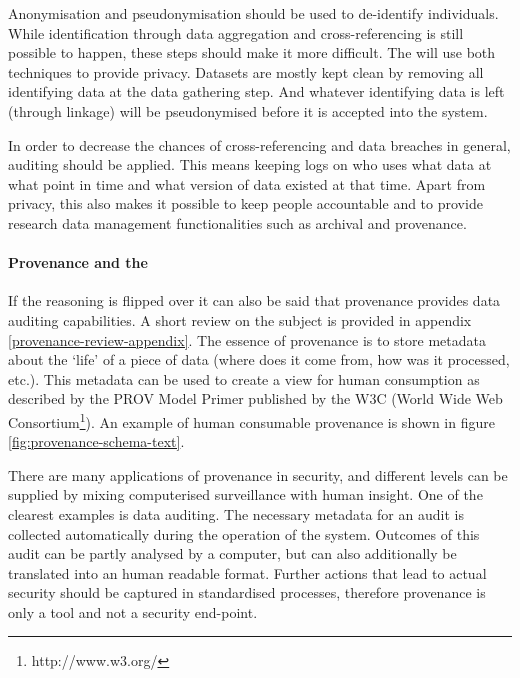Anonymisation and pseudonymisation should be used to de-identify individuals.
While identification through data aggregation and cross-referencing is still possible to happen, these steps should make it more difficult.
The \ivfsystem{} will use both techniques to provide privacy. Datasets are mostly kept clean by removing all identifying data at the data gathering step.
And whatever identifying data is left (through linkage) will be pseudonymised before it is accepted into the system.

In order to decrease the chances of cross-referencing and data breaches in general, auditing should be applied.
This means keeping logs on who uses what data at what point in time and what version of data existed at that time.
Apart from privacy, this also makes it possible to keep people accountable and to provide research data management functionalities such as archival and provenance.

\paragraph{Provenance and the \ivfsystem{}}
If the reasoning is flipped over it can also be said that provenance provides data auditing capabilities.
A short review on the subject is provided in appendix \ref{provenance-review-appendix}.
The essence of provenance is to store metadata about the `life' of a piece of data (where does it come from, how was it processed, etc.).
This metadata can be used to create a view for human consumption as described by the PROV Model Primer \cite{dsp8gil} published by the W3C (World Wide Web Consortium\footnote{http://www.w3.org/}).
An example of human consumable provenance is shown in figure \ref{fig:provenance-schema-text}.

There are many applications of provenance in security, and  different levels can be supplied by mixing computerised surveillance with human insight.
One of the clearest examples is  data auditing.
The necessary metadata for an audit is collected automatically during the operation of the system.
Outcomes of this audit can be partly analysed by a computer, but can also additionally be translated into an human readable format.
Further actions that lead to actual security  should be captured in standardised processes, therefore provenance is only a tool and not a security end-point.

